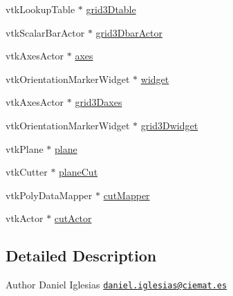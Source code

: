 \begin{DoxyCompactItemize}
\item 
vtk\-Lookup\-Table $\ast$ \hyperlink{classGeometry_ac1594e947b2efc680e2fb82c39a554d9}{grid3\-Dtable}
\item 
vtk\-Scalar\-Bar\-Actor $\ast$ \hyperlink{classGeometry_af384c0e243c658c029afe53df9e59fd2}{grid3\-Dbar\-Actor}
\item 
vtk\-Axes\-Actor $\ast$ \hyperlink{classGeometry_a17c7a286dc0a428e8a32db4c8d54bb5e}{axes}
\item 
vtk\-Orientation\-Marker\-Widget $\ast$ \hyperlink{classGeometry_ad611799bc0eb8825c963bd6d56181d8c}{widget}
\item 
vtk\-Axes\-Actor $\ast$ \hyperlink{classGeometry_a09df01c00f88d60da5404fa9f40c01f8}{grid3\-Daxes}
\item 
vtk\-Orientation\-Marker\-Widget $\ast$ \hyperlink{classGeometry_ad2e8316d21178ddc0b9f1e163cf8683b}{grid3\-Dwidget}
\item 
vtk\-Plane $\ast$ \hyperlink{classGeometry_a79ad1de7fbe1c74e3e2226489ac7188b}{plane}
\item 
vtk\-Cutter $\ast$ \hyperlink{classGeometry_afa017d6536259e954e4ca10337b4353b}{plane\-Cut}
\item 
vtk\-Poly\-Data\-Mapper $\ast$ \hyperlink{classGeometry_ae6a74274d05291746f520af8083a26e7}{cut\-Mapper}
\item 
vtk\-Actor $\ast$ \hyperlink{classGeometry_a2a10ca6a0a6a4e1cdd5558830db80ec9}{cut\-Actor}
\end{DoxyCompactItemize}


\subsection{Detailed Description}
\begin{DoxyAuthor}{Author}
Daniel Iglesias \href{mailto:daniel.iglesias@ciemat.es}{\tt daniel.\-iglesias@ciemat.\-es} 
\end{DoxyAuthor}


